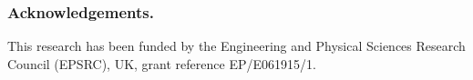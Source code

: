 \documentclass{llncs}
\begin{document}
\subsubsection*{Acknowledgements. } 
This research has been funded by the Engineering and Physical Sciences Research Council (EPSRC), UK, grant reference EP/E061915/1.
%
\end{document}
